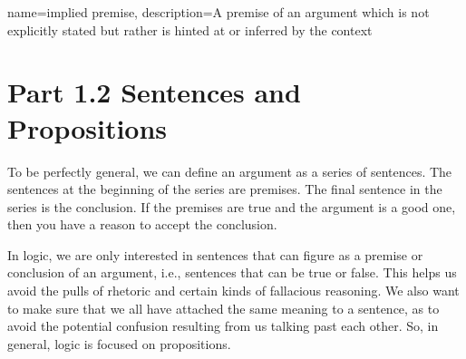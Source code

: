 {
name=implied premise,
description={A premise of an argument which is not explicitly stated but rather is hinted at or inferred by the context}
}


\section{Part 1.2 Sentences and Propositions}
\label{Some Basics from Philosophy of Language}

To be perfectly general, we can define an \gls{argument} as a series of sentences. The sentences at the beginning of the series are premises. The final sentence in the series is the conclusion. If the premises are true and the argument is a good one, then you have a reason to accept the conclusion.

In logic, we are only interested in sentences that can figure as a premise or conclusion of an argument, i.e., sentences that can be true or false. This helps us avoid the pulls of rhetoric and certain kinds of fallacious reasoning. We also want to make sure that we all have attached the same meaning to a sentence, as to avoid the potential confusion resulting from us talking past each other. So, in general, logic is focused on propositions.

